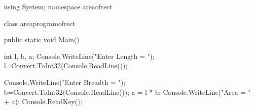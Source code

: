 using System;
namespace areaofrect
{
    class areaprogramofrect
    {
        public static void Main()
        {
            int l, b, a;
            Console.WriteLine("Enter Length = ");
            l=Convert.ToInt32(Console.ReadLine());

            Console.WriteLine("Enter Breadth = ");
            b=Convert.ToInt32(Console.ReadLine());
            a = l * b;
            Console.WriteLine("Area = " + a);
            Console.ReadKey();


        }
    }

}
